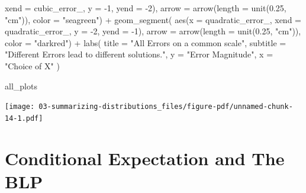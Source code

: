 \documentclass[
  letterpaper,
  DIV=11,
  numbers=noendperiod]{scrreprt}
\newenvironment{Shaded}{\begin{snugshade}}{\end{snugshade}}
\newcommand{\AttributeTok}[1]{\textcolor[rgb]{0.40,0.45,0.13}{#1}}
\newcommand{\DecValTok}[1]{\textcolor[rgb]{0.68,0.00,0.00}{#1}}
\newcommand{\FloatTok}[1]{\textcolor[rgb]{0.68,0.00,0.00}{#1}}
\newcommand{\FunctionTok}[1]{\textcolor[rgb]{0.28,0.35,0.67}{#1}}
\newcommand{\NormalTok}[1]{\textcolor[rgb]{0.00,0.23,0.31}{#1}}
\newcommand{\SpecialCharTok}[1]{\textcolor[rgb]{0.37,0.37,0.37}{#1}}
\newcommand{\StringTok}[1]{\textcolor[rgb]{0.13,0.47,0.30}{#1}}
\begin{document}
\begin{Shaded}
\begin{Highlighting}[]
    \AttributeTok{xend =}\NormalTok{ cubic\_error\_, }
    \AttributeTok{y =} \SpecialCharTok{{-}}\DecValTok{1}\NormalTok{, }
    \AttributeTok{yend =} \SpecialCharTok{{-}}\DecValTok{2}\NormalTok{), }
    \AttributeTok{arrow =} \FunctionTok{arrow}\NormalTok{(}\AttributeTok{length =} \FunctionTok{unit}\NormalTok{(}\FloatTok{0.25}\NormalTok{, }\StringTok{"cm"}\NormalTok{)),}
    \AttributeTok{color =} \StringTok{"seagreen"}\NormalTok{)  }\SpecialCharTok{+} 
  \FunctionTok{geom\_segment}\NormalTok{(}
    \FunctionTok{aes}\NormalTok{(}\AttributeTok{x =}\NormalTok{ quadratic\_error\_, }
    \AttributeTok{xend =}\NormalTok{ quadratic\_error\_, }
    \AttributeTok{y =} \SpecialCharTok{{-}}\DecValTok{2}\NormalTok{, }
    \AttributeTok{yend =} \SpecialCharTok{{-}}\DecValTok{1}\NormalTok{), }
    \AttributeTok{arrow =} \FunctionTok{arrow}\NormalTok{(}\AttributeTok{length =} \FunctionTok{unit}\NormalTok{(}\FloatTok{0.25}\NormalTok{, }\StringTok{"cm"}\NormalTok{)),}
    \AttributeTok{color =} \StringTok{"darkred"}\NormalTok{)  }\SpecialCharTok{+} 
  \FunctionTok{labs}\NormalTok{(}
    \AttributeTok{title    =} \StringTok{"All Errors on a common scale"}\NormalTok{, }
    \AttributeTok{subtitle =} \StringTok{"Different Errors lead to different solutions."}\NormalTok{, }
    \AttributeTok{y        =} \StringTok{"Error Magnitude"}\NormalTok{, }
    \AttributeTok{x        =} \StringTok{"Choice of X"}
\NormalTok{  )}

\NormalTok{all\_plots}
\end{Highlighting}
\end{Shaded}

\texttt{[image: 03-summarizing-distributions\_files/figure-pdf/unnamed-chunk-14-1.pdf]}

\chapter{Conditional Expectation and The
BLP}\label{conditional-expectation-and-the-blp}
\end{document}
